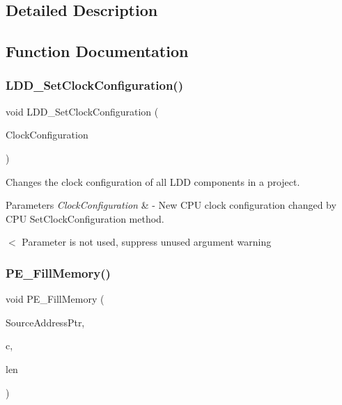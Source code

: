 \subsection{Detailed Description}


\subsection{Function Documentation}
\mbox{\label{group___p_e___l_d_d__module_ga7fe8a131453ba765c5e85130a282eafb}} 
\subsubsection{\texorpdfstring{L\+D\+D\+\_\+\+Set\+Clock\+Configuration()}{LDD\_SetClockConfiguration()}}
{\footnotesize\ttfamily void L\+D\+D\+\_\+\+Set\+Clock\+Configuration (\begin{DoxyParamCaption}\item[{\hyperlink{group___p_e___types__module_ga369bcaf7f00caad5f994c72ac2629a37}{L\+D\+D\+\_\+\+T\+Clock\+Configuration}}]{Clock\+Configuration }\end{DoxyParamCaption})}



Changes the clock configuration of all L\+DD components in a project. 


\begin{DoxyParams}{Parameters}
{\em Clock\+Configuration} & -\/ New C\+PU clock configuration changed by C\+PU Set\+Clock\+Configuration method. \\
\hline
\end{DoxyParams}
$<$ Parameter is not used, suppress unused argument warning \mbox{\label{group___p_e___l_d_d__module_ga6cb22864b71fd00f200c9fb3375f4e29}} 
\subsubsection{\texorpdfstring{P\+E\+\_\+\+Fill\+Memory()}{PE\_FillMemory()}}
{\footnotesize\ttfamily void P\+E\+\_\+\+Fill\+Memory (\begin{DoxyParamCaption}\item[{register void $\ast$}]{Source\+Address\+Ptr,  }\item[{register uint8\+\_\+t}]{c,  }\item[{register uint32\+\_\+t}]{len }\end{DoxyParamCaption})}



